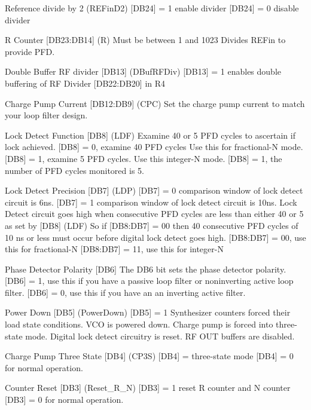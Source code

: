 Reference divide by 2 (R\+E\+Fin\+D2) \mbox{[}D\+B24\mbox{]} = 1 enable divider \mbox{[}D\+B24\mbox{]} = 0 disable divider

R Counter \mbox{[}D\+B23\+:D\+B14\mbox{]} (R) Must be between 1 and 1023 Divides R\+E\+Fin to provide P\+FD.

Double Buffer RF divider \mbox{[}D\+B13\mbox{]} (D\+Buf\+R\+F\+Div) \mbox{[}D\+B13\mbox{]} = 1 enables double buffering of RF Divider \mbox{[}D\+B22\+:D\+B20\mbox{]} in R4

Charge Pump Current \mbox{[}D\+B12\+:D\+B9\mbox{]} (C\+PC) Set the charge pump current to match your loop filter design.

Lock Detect Function \mbox{[}D\+B8\mbox{]} (L\+DF) Examine 40 or 5 P\+FD cycles to ascertain if lock achieved. \mbox{[}D\+B8\mbox{]} = 0, examine 40 P\+FD cycles Use this for fractional-\/N mode. \mbox{[}D\+B8\mbox{]} = 1, examine 5 P\+FD cycles. Use this integer-\/N mode. \mbox{[}D\+B8\mbox{]} = 1, the number of P\+FD cycles monitored is 5.

Lock Detect Precision \mbox{[}D\+B7\mbox{]} (L\+DP) \mbox{[}D\+B7\mbox{]} = 0 comparison window of lock detect circuit is 6ns. \mbox{[}D\+B7\mbox{]} = 1 comparison window of lock detect circuit is 10ns. Lock Detect circuit goes high when consecutive P\+FD cycles are less than either 40 or 5 as set by \mbox{[}D\+B8\mbox{]} (L\+DF) So if \mbox{[}D\+B8\+:D\+B7\mbox{]} = 00 then 40 consecutive P\+FD cycles of 10 ns or less must occur before digital lock detect goes high. \mbox{[}D\+B8\+:D\+B7\mbox{]} = 00, use this for fractional-\/N \mbox{[}D\+B8\+:D\+B7\mbox{]} = 11, use this for integer-\/N

Phase Detector Polarity \mbox{[}D\+B6\mbox{]} The D\+B6 bit sets the phase detector polarity. \mbox{[}D\+B6\mbox{]} = 1, use this if you have a passive loop filter or noninverting active loop filter. \mbox{[}D\+B6\mbox{]} = 0, use this if you have an an inverting active filter.

Power Down \mbox{[}D\+B5\mbox{]} (Power\+Down) \mbox{[}D\+B5\mbox{]} = 1 Synthesizer counters forced their load state conditions. V\+CO is powered down. Charge pump is forced into three-\/state mode. Digital lock detect circuitry is reset. RF O\+UT buffers are disabled.

Charge Pump Three State \mbox{[}D\+B4\mbox{]} (C\+P3S) \mbox{[}D\+B4\mbox{]} = three-\/state mode \mbox{[}D\+B4\mbox{]} = 0 for normal operation.

Counter Reset \mbox{[}D\+B3\mbox{]} (Reset\+\_\+\+R\+\_\+N) \mbox{[}D\+B3\mbox{]} = 1 reset R counter and N counter \mbox{[}D\+B3\mbox{]} = 0 for normal operation. 

